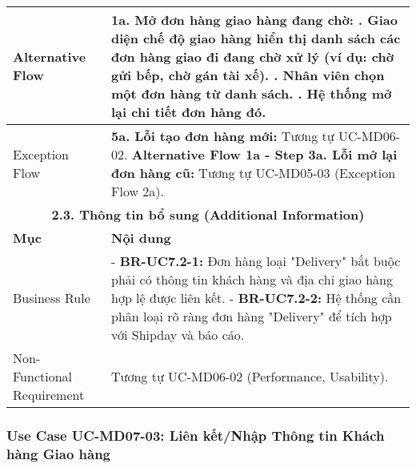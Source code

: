 \begin{longtable}{|m{4cm}|p{11cm}|}
\hline
Alternative Flow & \textbf{1a. Mở đơn hàng giao hàng đang chờ:} \newline    1. Giao diện chế độ giao hàng hiển thị danh sách các đơn hàng giao đi đang chờ xử lý (ví dụ: chờ gửi bếp, chờ gán tài xế). \newline    2. Nhân viên chọn một đơn hàng từ danh sách. \newline    3. Hệ thống mở lại chi tiết đơn hàng đó. \\
\hline
Exception Flow & \textbf{5a. Lỗi tạo đơn hàng mới:} Tương tự UC-MD06-02. \newline \textbf{Alternative Flow 1a - Step 3a. Lỗi mở lại đơn hàng cũ:} Tương tự UC-MD05-03 (Exception Flow 2a). \\
\hline
\multicolumn{2}{|c|}{\textbf{2.3. Thông tin bổ sung (Additional Information)}} \\
\hline
\textbf{Mục} & \textbf{Nội dung} \\
\hline
Business Rule & - \textbf{BR-UC7.2-1:} Đơn hàng loại "Delivery" bắt buộc phải có thông tin khách hàng và địa chỉ giao hàng hợp lệ được liên kết. \newline - \textbf{BR-UC7.2-2:} Hệ thống cần phân loại rõ ràng đơn hàng "Delivery" để tích hợp với Shipday và báo cáo. \\
\hline
Non-Functional Requirement & Tương tự UC-MD06-02 (Performance, Usability). \\
\hline
\end{longtable}

\subsubsection{Use Case UC-MD07-03: Liên kết/Nhập Thông tin Khách hàng Giao hàng}

